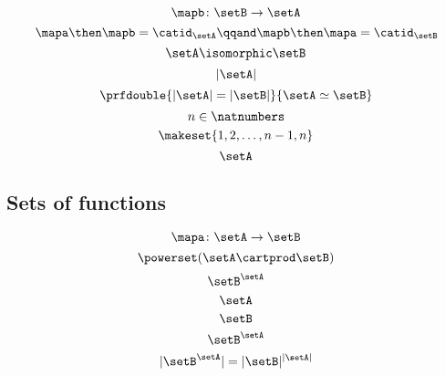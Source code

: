 \begin{forslides}
\begin{equation}\label{eq:slides_session2_148}
\mapb \colon \setB \to \setA
\end{equation}
\begin{equation}\label{eq:slides_session2_149}
\mapa \then \mapb = \catid_\setA
        \qqand
        \mapb \then \mapa = \catid_\setB
\end{equation}
\begin{equation}\label{eq:slides_session2_150}
\setA \isomorphic \setB
\end{equation}
\begin{equation}\label{eq:slides_session2_151}
\vert \setA \vert
\end{equation}
\begin{equation}\label{eq:slides_session2_152}
\prfdouble{ \vert \setA \vert = \vert \setB \vert }{ \setA \simeq \setB }
\end{equation}
\begin{equation}\label{eq:slides_session2_153}
n \in \natnumbers
\end{equation}
\begin{equation}\label{eq:slides_session2_154}
\makeset{1,2, \dots, n-1, n}
\end{equation}
\begin{equation}\label{eq:slides_session2_155}
\setA
\end{equation}

\subsection{Sets of functions}

\begin{equation}\label{eq:slides_session2_156}
\mapa \colon \setA \to \setB
\end{equation}
\begin{equation}\label{eq:slides_session2_157}
\powerset (\setA \cartprod \setB)
\end{equation}
\begin{equation}\label{eq:slides_session2_158}
\setB^{\setA}
\end{equation}
\begin{equation}\label{eq:slides_session2_159}
\setA
\end{equation}
\begin{equation}\label{eq:slides_session2_160}
\setB
\end{equation}
\begin{equation}\label{eq:slides_session2_161}
\setB^{\setA}
\end{equation}
\begin{equation}\label{eq:slides_session2_162}
\vert \setB^{\setA} \vert = \vert \setB \vert^{\vert \setA \vert}
\end{equation}


\end{forslides}
